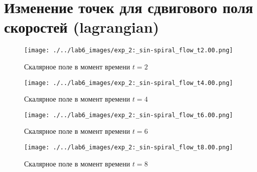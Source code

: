 \chapter{Изменение точек для сдвигового поля скоростей (lagrangian)}
\label{app:shear_lg}

\begin{figure}[h]
	\centering
	\texttt{[image: ./../lab6\_images/exp\_2:\_sin-spiral\_flow\_t2.00.png]}
	\caption{Скалярное поле в момент времени $t=2$ }
\end{figure}
\begin{figure}[h]
	\centering
	\texttt{[image: ./../lab6\_images/exp\_2:\_sin-spiral\_flow\_t4.00.png]}
	\caption{Скалярное поле в момент времени $t=4$}
\end{figure}
\begin{figure}[h]
	\centering
	\texttt{[image: ./../lab6\_images/exp\_2:\_sin-spiral\_flow\_t6.00.png]}
	\caption{Скалярное поле в момент времени $t=6$ }
\end{figure}
\begin{figure}[h]
	\centering
	\texttt{[image: ./../lab6\_images/exp\_2:\_sin-spiral\_flow\_t8.00.png]}
	\caption{Скалярное поле в момент времени $t=8$ }
\end{figure}